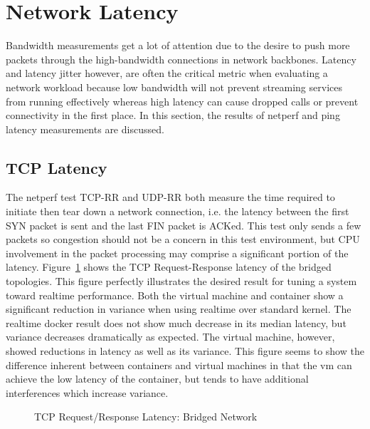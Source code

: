 


\section{Network Latency} %
\label{sec:networklatency}
Bandwidth measurements get a lot of attention due to the desire to push more packets through the high-bandwidth connections in network backbones.
Latency and latency jitter however, are often the critical metric when evaluating a network workload because low bandwidth will not prevent streaming services from running effectively whereas high latency can cause dropped calls or prevent connectivity in the first place.
In this section, the results of netperf and ping latency measurements are discussed.  

\subsection{TCP Latency} %
\label{sub:tcplatency}
The netperf test TCP-RR and UDP-RR both measure the time required to initiate then tear down a network connection, i.e. the latency between the first SYN packet is sent and the last FIN packet is ACKed.  
This test only sends a few packets so congestion should not be a concern in this test environment, but CPU involvement in the packet processing may comprise a significant portion of the latency.  
Figure~\ref{fig:tcp_rr_bridge} shows the TCP Request-Response latency of the bridged topologies.
This figure perfectly illustrates the desired result for tuning a system toward realtime performance.
Both the virtual machine and container show a significant reduction in variance when using realtime over standard kernel.
The realtime docker result does not show much decrease in its median latency, but variance decreases dramatically as expected.
The virtual machine, however, showed reductions in latency as well as its variance.
This figure seems to show the difference inherent between containers and virtual machines in that the vm can achieve the low latency of the container, but tends to have additional interferences which increase variance.  

\begin{figure}
    \centering
    \def\svgwidth{\columnwidth}
    
    \caption{TCP Request/Response Latency: Bridged Network}
    \label{fig:tcp_rr_bridge}
\end{figure}

